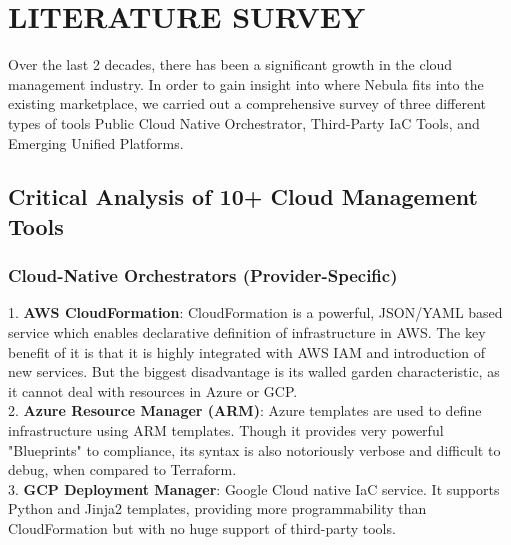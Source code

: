 \chapter{LITERATURE SURVEY}
\thispagestyle{plain}

Over the last 2 decades, there has been a significant growth in the cloud management industry. In order to gain insight into where Nebula fits into the existing marketplace, we carried out a comprehensive survey of three different types of tools Public Cloud Native Orchestrator, Third-Party IaC Tools, and Emerging Unified Platforms.

\section{Critical Analysis of 10+ Cloud Management Tools}

\subsection{Cloud-Native Orchestrators (Provider-Specific)}
1. \textbf{AWS CloudFormation}: CloudFormation is a powerful, JSON/YAML based service which enables declarative definition of infrastructure in AWS. The key benefit of it is that it is highly integrated with AWS IAM and introduction of new services. But the biggest disadvantage is its walled garden characteristic, as it cannot deal with resources in Azure or GCP. \\
2. \textbf{Azure Resource Manager (ARM)}: Azure templates are used to define infrastructure using ARM templates. Though it provides very powerful "Blueprints" to compliance, its syntax is also notoriously verbose and difficult to debug, when compared to Terraform. \\
3. \textbf{GCP Deployment Manager}: Google Cloud native IaC service. It supports Python and Jinja2 templates, providing more programmability than CloudFormation but with no huge support of third-party tools.

